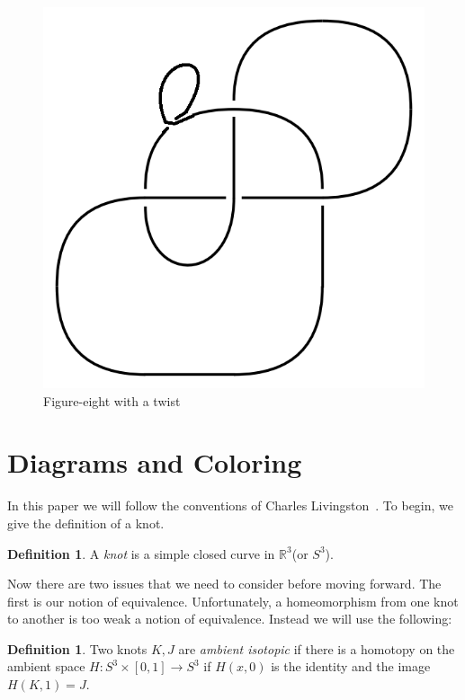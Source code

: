 \documentclass[12pt]{amsart}
\theoremstyle{definition}
\newtheorem{definition}[theorem]{Definition}
\theoremstyle{remark}
\numberwithin{equation}{section}
\newcommand{\bb}[1]{\mathbb{#1}}
\newcommand{\ds}{.3}
\begin{document}
\begin{figure}
  \includegraphics[scale=\ds]{figure-eight-t}
  \caption{Figure-eight with a twist}
  \label{fig:figure-eight-t}
\end{figure}

\section{Diagrams and Coloring}
\label{sec:diagrams-coloring}

In this paper we will follow the conventions of Charles
Livingston~\cite{Livingston}. To begin, we give the definition of a knot.

\begin{definition}
  A \textit{knot} is a simple closed curve in $\bb{R}^3$(or $S^3$).
\end{definition}

Now there are two issues that we need to consider before moving forward.
The first is our notion of equivalence. Unfortunately, a homeomorphism from
one knot to another is too weak a notion of equivalence. Instead we will
use the following: 

\begin{definition}
  Two knots $K,J$ are \textit{ambient isotopic} if there is a homotopy on the ambient
  space $H:S^3\times [0,1]\rightarrow S^3$ if $H(x,0)$ is the identity and the
  image $H(K,1)=J$.
\end{definition}
\end{document}
